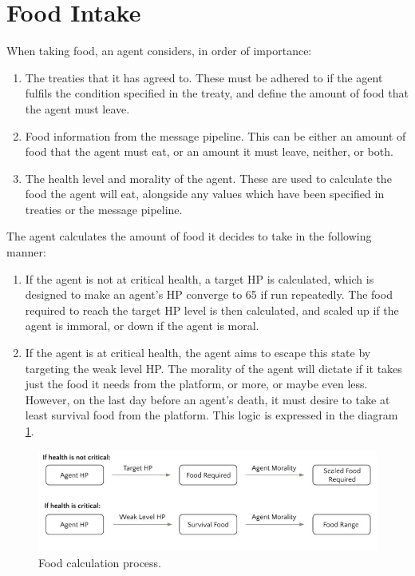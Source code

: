 \section{Food Intake}\label{sec:food_intake}
When taking food, an agent considers, in order of importance:
\begin{enumerate}
    \item The treaties that it  has  agreed to. These must be adhered to if the agent fulfils the condition specified in the treaty, and define the amount of food that the agent must leave. 
    \item Food information from the message pipeline. This can be either an amount of food that the agent must eat, or an amount it must leave, neither, or both.
    \item The health level and morality of the agent. These are used to calculate the food the agent will eat, alongside any values which have been specified in treaties or the message pipeline.
\end{enumerate}
The agent calculates the amount of food it decides to take in the following manner: 
\begin{enumerate}
    \item If the agent is not at critical health, a target HP is calculated, which is designed to make an agent's HP converge to 65 if run repeatedly. The food required to reach the target HP level is then calculated, and scaled up if the agent is immoral, or down if the agent is moral.
    \item If the agent is at critical health, the agent aims to escape this state by targeting the weak level HP. The morality of the agent will dictate if it takes just the food it needs from the platform, or more, or maybe even less. However, on the last day before an agent’s death, it must desire to take at least survival food from the platform. This logic is expressed in the diagram \ref{fig:food-diagram}.
\end{enumerate}
\begin{figure}[htb]
    \centering
    \includegraphics[width=0.5\linewidth]{005_team_3_agent_design/images/diagram1.jpg}
    \caption{Food calculation process.}
    \label{fig:food-diagram}
\end{figure}
